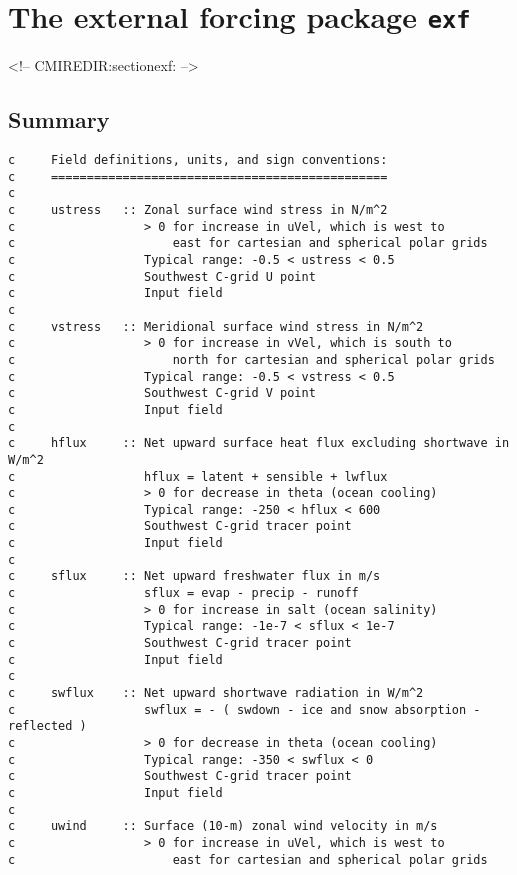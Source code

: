 \section{The external forcing package \texttt{exf}
\label{sectionexf}}
\begin{rawhtml}
<!-- CMIREDIR:sectionexf: -->
\end{rawhtml}

\subsection{Summary}

{\footnotesize
\begin{verbatim}
c     Field definitions, units, and sign conventions:
c     ===============================================
c
c     ustress   :: Zonal surface wind stress in N/m^2
c                  > 0 for increase in uVel, which is west to
c                      east for cartesian and spherical polar grids
c                  Typical range: -0.5 < ustress < 0.5
c                  Southwest C-grid U point
c                  Input field
c
c     vstress   :: Meridional surface wind stress in N/m^2
c                  > 0 for increase in vVel, which is south to
c                      north for cartesian and spherical polar grids
c                  Typical range: -0.5 < vstress < 0.5
c                  Southwest C-grid V point
c                  Input field
c
c     hflux     :: Net upward surface heat flux excluding shortwave in W/m^2
c                  hflux = latent + sensible + lwflux
c                  > 0 for decrease in theta (ocean cooling)
c                  Typical range: -250 < hflux < 600
c                  Southwest C-grid tracer point
c                  Input field
c
c     sflux     :: Net upward freshwater flux in m/s
c                  sflux = evap - precip - runoff
c                  > 0 for increase in salt (ocean salinity)
c                  Typical range: -1e-7 < sflux < 1e-7
c                  Southwest C-grid tracer point
c                  Input field
c
c     swflux    :: Net upward shortwave radiation in W/m^2
c                  swflux = - ( swdown - ice and snow absorption - reflected )
c                  > 0 for decrease in theta (ocean cooling)
c                  Typical range: -350 < swflux < 0
c                  Southwest C-grid tracer point
c                  Input field
c
c     uwind     :: Surface (10-m) zonal wind velocity in m/s
c                  > 0 for increase in uVel, which is west to
c                      east for cartesian and spherical polar grids

\end{verbatim}}
